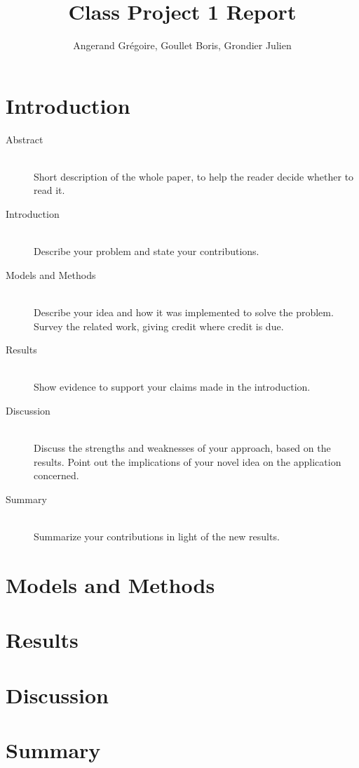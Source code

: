 \documentclass[10pt,conference,compsocconf]{IEEEtran}
\begin{document}
\title{Class Project 1 Report}

\author{
  Angerand Gr\'egoire, Goullet Boris, Grondier Julien 
}

\maketitle

\begin{abstract}
\end{abstract}

\section{Introduction}

\begin{description}
\item[Abstract] \ \\
  Short description of the whole paper, to help the
  reader decide whether to read it.
\item[Introduction] \ \\
  Describe your problem and state your
  contributions.
\item[Models and Methods] \ \\
  Describe your idea and how it was implemented to solve
  the problem. Survey the related work, giving credit where credit is
  due.
\item[Results] \ \\
  Show evidence to support your claims made in the
  introduction.
\item[Discussion] \ \\
  Discuss the strengths and weaknesses of your
  approach, based on the results. Point out the implications of your
  novel idea on the application concerned.
\item[Summary] \ \\
  Summarize your contributions in light of the new
  results.
\end{description}

\section{Models and Methods}


\section{Results}

\section{Discussion}


\section{Summary}
\end{document}
